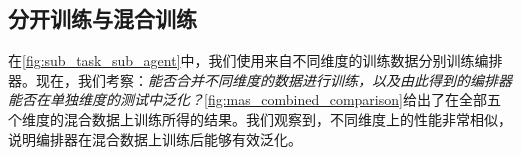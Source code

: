 






\subsection{分开训练与混合训练}

在\cref{fig:sub_task_sub_agent}中，我们使用来自不同维度的训练数据分别训练编排器。现在，我们考察：\textit{能否合并不同维度的数据进行训练，以及由此得到的编排器能否在单独维度的测试中泛化？}\cref{fig:mas_combined_comparison}给出了在全部五个维度的混合数据上训练所得的结果。我们观察到，不同维度上的性能非常相似，说明编排器在混合数据上训练后能够有效泛化。





